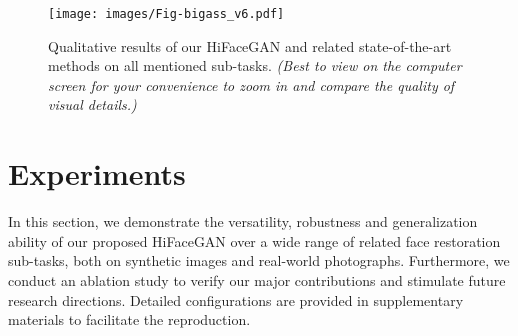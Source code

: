 \documentclass[sigconf]{acmart}
\begin{document}
\begin{table}[!t]
	\centering
	\caption{Ablation study results on 16x face hallucination.}
	\label{tab:ablation}
\end{table}

\begin{figure*}[!tp]
\centering
\texttt{[image: images/Fig-bigass\_v6.pdf]}
\caption{
	Qualitative results of our HiFaceGAN and related state-of-the-art methods on all mentioned sub-tasks. \emph{(Best to view on the computer screen for your convenience to zoom in and compare the quality of visual details.)}
}\label{fig:big_figure}
\end{figure*}


\section{Experiments}\label{sec:experiments}
In this section, we demonstrate the versatility, robustness and generalization ability of our proposed HiFaceGAN over a wide range of related face restoration sub-tasks, both on synthetic images and real-world photographs. Furthermore, we conduct an ablation study to verify our major contributions and stimulate future research directions. Detailed configurations are provided in supplementary materials to facilitate the reproduction.
\end{document}
